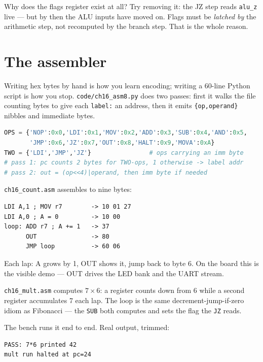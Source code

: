 \begin{checkpoint}
Why does the flags register exist at all? Try removing it: the JZ
step reads \texttt{alu\_z} live --- but by then the ALU inputs have
moved on. Flags must be \emph{latched by} the arithmetic step, not
recomputed by the branch step. That is the whole reason.
\end{checkpoint}

\section{The assembler}\label{sec:asm16}

Writing hex bytes by hand is how you learn encoding; writing a
60-line Python script is how you stop. \texttt{code/ch16\_asm8.py}
does two passes: first it walks the file counting bytes to give each
\texttt{label:} an address, then it emits \texttt{\{op,operand\}}
nibbles and immediate bytes.

\begin{lstlisting}[language=Python, caption={The assembler's core ---
from \ttfamily code/ch16\_asm8.py. Two passes: labels first, bytes
second.}, label={lst:asm16}]
OPS = {'NOP':0x0,'LDI':0x1,'MOV':0x2,'ADD':0x3,'SUB':0x4,'AND':0x5,
       'JMP':0x6,'JZ':0x7,'OUT':0x8,'HALT':0x9,'MOVA':0xA}
TWO = {'LDI','JMP','JZ'}                # ops carrying an imm byte
# pass 1: pc counts 2 bytes for TWO-ops, 1 otherwise -> label addr
# pass 2: out = (op<<4)|operand, then imm byte if needed
\end{lstlisting}

\begin{example}
\texttt{ch16\_count.asm} assembles to nine bytes:

\begin{lstlisting}[caption={\ttfamily ch16\_count.asm and its
assembly --- \ttfamily ch16\_count.hex.}]
LDI A,1 ; MOV r7        -> 10 01 27
LDI A,0 ; A = 0         -> 10 00
loop: ADD r7 ; A += 1   -> 37
      OUT               -> 80
      JMP loop          -> 60 06
\end{lstlisting}

Each lap: A grows by 1, OUT shows it, jump back to byte 6. On the
board this is the visible demo --- OUT drives the LED bank and the
UART stream.
\end{example}

\begin{example}
\texttt{ch16\_mult.asm} computes $7\times6$: a register counts down
from 6 while a second register accumulates 7 each lap. The loop is
the same decrement-jump-if-zero idiom as Fibonacci --- the
\texttt{SUB} both computes and sets the flag the \texttt{JZ} reads.

The bench runs it end to end. Real output, trimmed:

\begin{lstlisting}[caption={\ttfamily ch16\_cpu8\_mult\_tb.v running
\texttt{mult.hex} --- the machine prints 42 and parks.}]
PASS: 7*6 printed 42
mult run halted at pc=24
\end{lstlisting}
\end{example}

